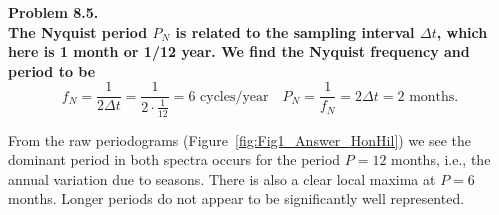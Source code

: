 \noindent
\bf{Problem 8.5.} \\

The Nyquist period $P_N$ is related to the sampling interval $\Delta t$, which here is 1 month or 1/12 year.
We find the Nyquist frequency and period to be
$$
f_N = \frac{1}{2 \Delta t} = \frac{1}{2 \cdot \frac{1}{12}} = 6 \mbox{ cycles/year}
\quad P_N = \frac{1}{f_N} = 2\Delta t = 2 \mbox{ months.}
$$

From the raw periodograms (Figure~\ref{fig:Fig1_Answer_HonHil}) we see the dominant period in both spectra occurs for the period $P = 12$ months,
i.e., the annual variation due to seasons.  There is also a clear local maxima at $P = 6$ months.  Longer periods
do not appear to be significantly well represented.


